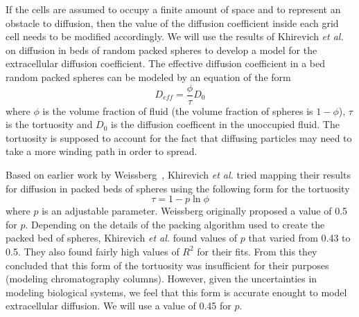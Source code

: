 \documentclass[12pt]{article}
\begin{document}
If the cells are assumed to occupy a finite amount of space and to represent an obstacle
to diffusion, then the value of the diffusion coefficient inside each grid cell needs to
be modified accordingly. We will use the results of Khirevich {\em et al.}~\cite{Khirevich}
on diffusion in beds of random packed spheres to develop a model for the extracellular
diffusion coefficient. The effective diffusion coefficient in a bed random packed spheres
can be modeled by an equation of the form
\[
D_{eff} = \frac{\phi}{\tau}D_0
\]
where $\phi$ is the volume fraction of fluid (the volume fraction of spheres is $1-\phi$),
$\tau$ is the tortuosity and $D_0$ is the diffusion coefficent in the unoccupied fluid. The
tortuosity is supposed to account for the fact that diffusing particles may need to take a
more winding path in order to spread.

Based on earlier work by Weissberg~\cite{Weissberg}, Khirevich
{\em et al.} tried mapping their results for diffusion in packed beds of spheres using the
following form for the tortuosity
\[
\tau = 1 - p\ln \phi
\]
where $p$ is an adjustable parameter. Weissberg originally proposed a value of 0.5 for $p$.
Depending on the details of the packing algorithm used to create the packed bed of spheres,
Khirevich {\em et al.} found values of $p$ that varied from 0.43 to 0.5. They also found
fairly high values of $R^2$ for their fits. From this they concluded that this form of the
tortuosity was insufficient for their purposes (modeling chromatography columns). However,
given the uncertainties in modeling biological systems, we feel that this form is accurate
enought to model extracellular diffusion. We will use a value of 0.45 for $p$.
\end{document}

